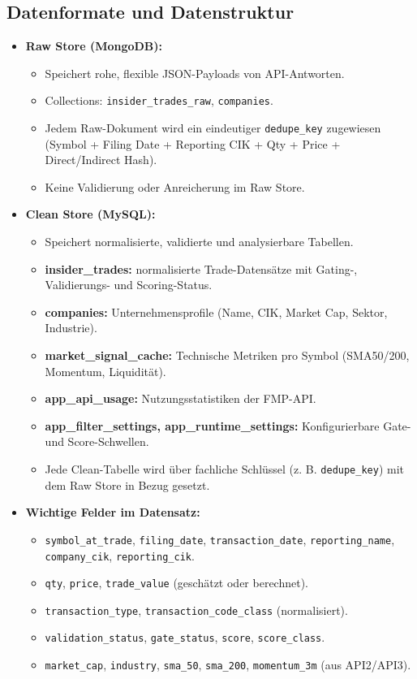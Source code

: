 \subsection{Datenformate und Datenstruktur}
\begin{itemize}
  \item \textbf{Raw Store (MongoDB):}
    \begin{itemize}
      \item Speichert rohe, flexible JSON-Payloads von API-Antworten.
      \item Collections: \texttt{insider\_trades\_raw}, \texttt{companies}.
      \item Jedem Raw-Dokument wird ein eindeutiger \texttt{dedupe\_key} zugewiesen (Symbol + Filing Date + Reporting CIK + Qty + Price + Direct/Indirect Hash). %
      \item Keine Validierung oder Anreicherung im Raw Store.
    \end{itemize}
  \item \textbf{Clean Store (MySQL):}
    \begin{itemize}
      \item Speichert normalisierte, validierte und analysierbare Tabellen.
      \item \textbf{insider\_trades:} normalisierte Trade-Datensätze mit Gating-, Validierungs- und Scoring-Status.
      \item \textbf{companies:} Unternehmensprofile (Name, CIK, Market Cap, Sektor, Industrie).
      \item \textbf{market\_signal\_cache:} Technische Metriken pro Symbol (SMA50/200, Momentum, Liquidität).
      \item \textbf{app\_api\_usage:} Nutzungsstatistiken der FMP-API.
      \item \textbf{app\_filter\_settings, app\_runtime\_settings:} Konfigurierbare Gate- und Score-Schwellen.
      \item Jede Clean-Tabelle wird über fachliche Schlüssel (z. B. \texttt{dedupe\_key}) mit dem Raw Store in Bezug gesetzt. %
    \end{itemize}
  \item \textbf{Wichtige Felder im Datensatz:}
    \begin{itemize}
      \item \texttt{symbol\_at\_trade}, \texttt{filing\_date}, \texttt{transaction\_date}, \texttt{reporting\_name}, \texttt{company\_cik}, \texttt{reporting\_cik}.
      \item \texttt{qty}, \texttt{price}, \texttt{trade\_value} (geschätzt oder berechnet).
      \item \texttt{transaction\_type}, \texttt{transaction\_code\_class} (normalisiert).
      \item \texttt{validation\_status}, \texttt{gate\_status}, \texttt{score}, \texttt{score\_class}.
      \item \texttt{market\_cap}, \texttt{industry}, \texttt{sma\_50}, \texttt{sma\_200}, \texttt{momentum\_3m} (aus API2/API3).
    \end{itemize}
\end{itemize}
